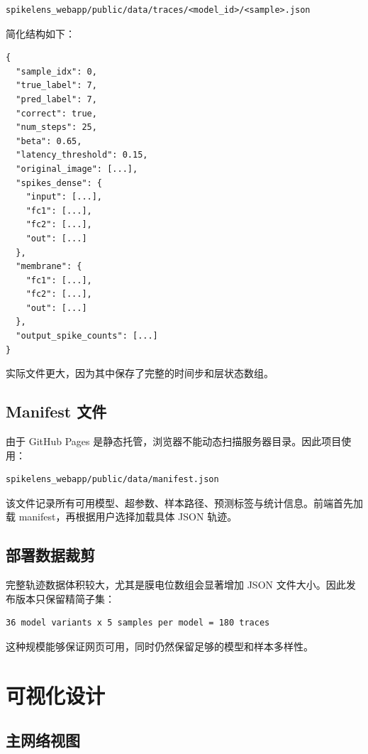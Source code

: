 \documentclass[UTF8,11pt,a4paper]{ctexart}
\begin{document}
\begin{lstlisting}
spikelens_webapp/public/data/traces/<model_id>/<sample>.json
\end{lstlisting}

简化结构如下：

\begin{lstlisting}
{
  "sample_idx": 0,
  "true_label": 7,
  "pred_label": 7,
  "correct": true,
  "num_steps": 25,
  "beta": 0.65,
  "latency_threshold": 0.15,
  "original_image": [...],
  "spikes_dense": {
    "input": [...],
    "fc1": [...],
    "fc2": [...],
    "out": [...]
  },
  "membrane": {
    "fc1": [...],
    "fc2": [...],
    "out": [...]
  },
  "output_spike_counts": [...]
}
\end{lstlisting}

实际文件更大，因为其中保存了完整的时间步和层状态数组。

\subsection{Manifest 文件}

由于 GitHub Pages 是静态托管，浏览器不能动态扫描服务器目录。因此项目使用：

\begin{lstlisting}
spikelens_webapp/public/data/manifest.json
\end{lstlisting}

该文件记录所有可用模型、超参数、样本路径、预测标签与统计信息。前端首先加载 manifest，再根据用户选择加载具体 JSON 轨迹。

\subsection{部署数据裁剪}

完整轨迹数据体积较大，尤其是膜电位数组会显著增加 JSON 文件大小。因此发布版本只保留精简子集：

\begin{lstlisting}
36 model variants x 5 samples per model = 180 traces
\end{lstlisting}

这种规模能够保证网页可用，同时仍然保留足够的模型和样本多样性。

\section{可视化设计}

\subsection{主网络视图}
\end{document}

